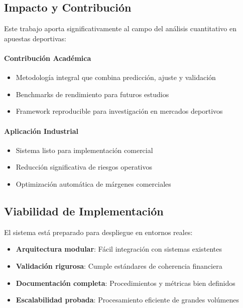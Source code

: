 \documentclass{article}
\begin{document}
\subsection{Impacto y Contribución}

Este trabajo aporta significativamente al campo del análisis cuantitativo en apuestas deportivas:

\paragraph{Contribución Académica}
\begin{itemize}
    \item Metodología integral que combina predicción, ajuste y validación
    \item Benchmarks de rendimiento para futuros estudios
    \item Framework reproducible para investigación en mercados deportivos
\end{itemize}

\paragraph{Aplicación Industrial}
\begin{itemize}
    \item Sistema listo para implementación comercial
    \item Reducción significativa de riesgos operativos
    \item Optimización automática de márgenes comerciales
\end{itemize}

\subsection{Viabilidad de Implementación}

El sistema está preparado para despliegue en entornos reales:

\begin{itemize}
    \item \textbf{Arquitectura modular}: Fácil integración con sistemas existentes
    \item \textbf{Validación rigurosa}: Cumple estándares de coherencia financiera
    \item \textbf{Documentación completa}: Procedimientos y métricas bien definidos
    \item \textbf{Escalabilidad probada}: Procesamiento eficiente de grandes volúmenes
\end{itemize}
\end{document}
